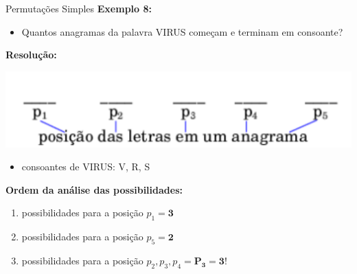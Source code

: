 \documentclass[aspectratio=169]{beamer}
\begin{document}
\begin{frame}{Permutações Simples}
    \textbf{Exemplo 8:}

    \vspace{2mm}

    \begin{itemize}
        \item[] Quantos anagramas da palavra VIRUS começam e terminam em consoante?
    \end{itemize}

    \textbf{Resolução:}

    \begin{center}
        \includegraphics[width=0.5\linewidth]{figs/Exemplo8_2.png}
    \end{center}

    
    \begin{itemize}
        \item consoantes de VIRUS: V, R, S
    \end{itemize}

    
    \textbf{Ordem da análise das possibilidades:}
    \begin{enumerate}[1)]
        \item possibilidades para a posição $p_1 = \boldsymbol{3}$ 
        \item possibilidades para a posição $p_5 = \boldsymbol{2}$ 
        \item possibilidades para a posição $p_2, p_3, p_4 = \boldsymbol{P_3 = 3!} $
    \end{enumerate}

\end{frame}
\end{document}
